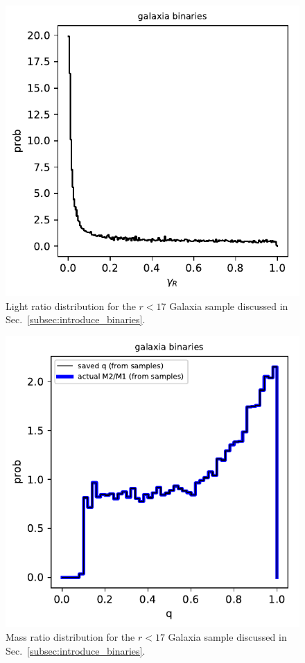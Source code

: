 \documentclass{emulateapj}
\begin{document}
\begin{figure}[!t]
	\begin{center}
		\includegraphics[scale=.8]{figures/galaxia_gammaR_distribn_mag_limited.pdf}
	\end{center}
	\caption{Light ratio distribution for the $r<17$ Galaxia sample discussed 
	in Sec.~\ref{subsec:introduce_binaries}.}
	\label{fig:galaxia_gammar_distribn}
\end{figure}
\begin{figure}[!t]
	\begin{center}
		\includegraphics[scale=.8]{figures/galaxia_q_distribn_mag_limited.pdf}
	\end{center}
	\caption{Mass ratio distribution for the $r<17$ Galaxia sample discussed 
		in Sec.~\ref{subsec:introduce_binaries}.}
	\label{fig:galaxia_q_distribn}
\end{figure}
\end{document}
